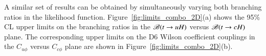 A similar set of results can be obtained by simultaneously varying both branching ratios in the likelihood function.
Figure~\ref{fig:limits_combo_2D}(a) shows the 95\% CL upper limits on the branching ratios in the $\mathscr{B}(t\rightarrow uH)$ versus $\mathscr{B}(t\rightarrow cH)$ plane. 
The corresponding upper limits on the D6 Wilson coefficient couplings in the $C_{u\phi}$ versus $C_{c\phi}$ plane are shown in Figure~\ref{fig:limits_combo_2D}(b).


